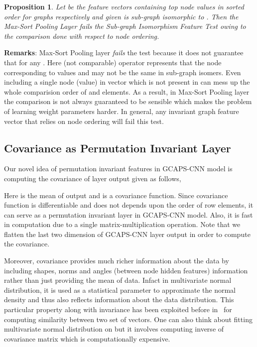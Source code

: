 \documentclass{article}
\newtheorem{prop}{Proposition}
\begin{document}
\begin{prop}\label{prop:isomorphic-test} Let  be the feature vectors containing top  node values in   sorted order for graphs  respectively and given  is sub-graph isomorphic to . Then the Max-Sort Pooling Layer \emph{fails} the Sub-graph Isomorphism Feature Test owing to the comparison done with respect to node ordering.
\end{prop}

\noindent\textbf{Remarks}: Max-Sort Pooling layer  \emph{fails} the test because it does not guarantee that   for any . Here   (not comparable) operator represents that the node corresponding to values  and   may not be the same in sub-graph isomers. Even including a single node (value) in  vector which is not present in  can mess up the whole comparision order of   and  elements.  As a result, in  Max-Sort Pooling layer the comparison is not always guaranteed to be sensible  which makes the problem of  learning  weight parameters harder. In general, any  invariant graph feature vector that relies on node ordering will fail this test.

\subsection{Covariance as Permutation Invariant Layer}
Our novel idea of   permutation invariant features in GCAPS-CNN model is  computing the covariance of   layer output  given as follows,



Here  is the mean of   output and  is a   covariance function. Since covariance function is differentiable and does not depends upon the order of row elements,  it can serve as a permutation invariant layer in  GCAPS-CNN model. Also, it is fast in computation due to a single matrix-multiplication operation. Note that we flatten the last two dimension of GCAPS-CNN layer output    in order to compute the   covariance.

Moreover, covariance provides much richer information about the data by including  shapes,  norms and angles (between node hidden features) information rather  than just providing the mean of  data. Infact in multivariate normal distribution, it is  used as a  statistical parameter to approximate the normal density and thus also reflects information about the data distribution. This particular property along with invariance has   been exploited before in~\cite{kondor2003kernel} for computing similarity between two set of vectors. One can also think about   fitting multivariate normal distribution on    but it involves computing inverse of  covariance matrix which is  computationally expensive. 
 
\end{document}
